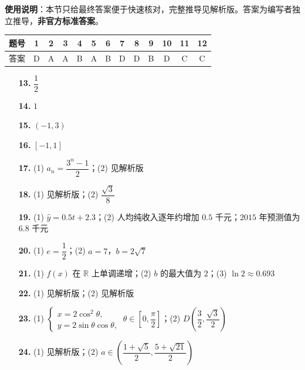 
\begin{gknotice}
\textbf{使用说明}：本节只给最终答案便于快速核对，完整推导见解析版。答案为编写者独立推导，\textbf{非官方标准答案}。
\end{gknotice}

\begin{center}\begin{tabular}{ccccccccccccc}
\toprule
题号 & 1 & 2 & 3 & 4 & 5 & 6 & 7 & 8 & 9 & 10 & 11 & 12 \\
\midrule
答案 & D & A & A & B & A & B & D & D & B & D & C & C \\
\bottomrule
\end{tabular}\end{center}

\begin{itemize}[leftmargin=2.6em]
  \item[\textbf{13.}] $\dfrac12$
  \item[\textbf{14.}] $1$
  \item[\textbf{15.}] $(-1,3)$
  \item[\textbf{16.}] $[-1,1]$
\end{itemize}

\begin{itemize}[leftmargin=2.6em]
  \item[\textbf{17.}] (1) $a_n=\dfrac{3^n-1}{2}$；(2) 见解析版
  \item[\textbf{18.}] (1) 见解析版；(2) $\dfrac{\sqrt3}{8}$
  \item[\textbf{19.}] (1) $\hat y=0.5t+2.3$；(2) 人均纯收入逐年约增加 $0.5$ 千元；$2015$ 年预测值为 $6.8$ 千元
  \item[\textbf{20.}] (1) $e=\dfrac12$；(2) $a=7$，$b=2\sqrt7$
  \item[\textbf{21.}] (1) $f(x)$ 在 $\mathbb R$ 上单调递增；(2) $b$ 的最大值为 $2$；(3) $\ln2\approx0.693$
  \item[\textbf{22.}] (1) 见解析版；(2) 见解析版
  \item[\textbf{23.}] (1) $\begin{cases}x=2\cos^2\theta,\\y=2\sin\theta\cos\theta,\end{cases}\ \theta\in\left[0,\dfrac\pi2\right]$；(2) $D\left(\dfrac32,\dfrac{\sqrt3}{2}\right)$
  \item[\textbf{24.}] (1) 见解析版；(2) $a\in\left(\dfrac{1+\sqrt5}{2},\dfrac{5+\sqrt{21}}2\right)$
\end{itemize}
